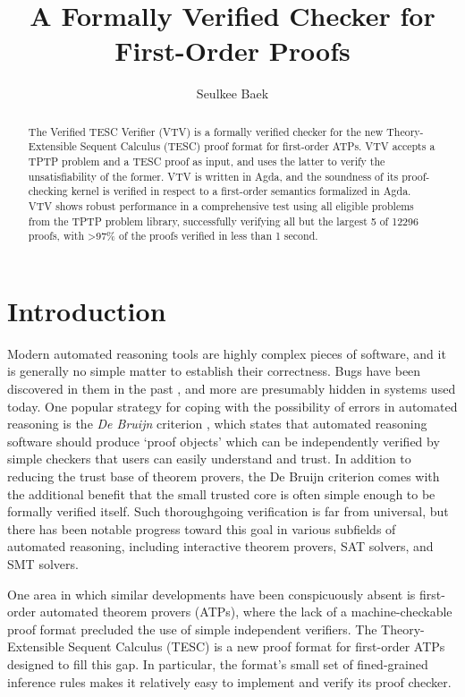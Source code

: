 \documentclass{lipics-v2021}
\title{A Formally Verified Checker for First-Order Proofs}
\author{Seulkee Baek}{Department of Philosophy, Carnegie Mellon University, United States}{seulkeeb@andrew.cmu.edu}{}{}
\begin{document}
\maketitle

\begin{abstract}

The Verified TESC Verifier (VTV) is a formally verified checker for the new 
Theory-Extensible Sequent Calculus (TESC) proof format for first-order ATPs. 
VTV accepts a TPTP problem and a TESC proof as input, and uses the latter to 
verify the unsatisfiability of the former. VTV is written in Agda, and the 
soundness of its proof-checking kernel is verified in respect to a first-order
semantics formalized in Agda. VTV shows robust performance in a comprehensive 
test using all eligible problems from the TPTP problem library, successfully 
verifying all but the largest 5 of 12296 proofs, with >97\% of the 
proofs verified in less than 1 second. 

\end{abstract}

\section{Introduction}

Modern automated reasoning tools are highly complex pieces of software, 
and it is generally no simple matter to establish their correctness.
Bugs have been discovered in them in the past \cite{reger2017testing,harrison2006towards}, 
and more are presumably hidden in systems used today. 
One popular strategy for coping with the possibility of errors 
in automated reasoning is the \textit{De Bruijn} criterion \cite{barendregt2005challenge}, 
which states that automated reasoning software should produce `proof objects' which can be 
independently verified by simple checkers that users can easily understand 
and trust. In addition to reducing the trust base of theorem provers, 
the De Bruijn criterion comes with the additional benefit that the 
small trusted core is often simple enough to be formally verified itself. 
Such thoroughgoing verification is far from universal, but there has been notable 
progress toward this goal in various subfields of automated reasoning, including 
interactive theorem provers, SAT solvers, and SMT solvers.

One area in which similar developments have been conspicuously absent is 
first-order automated theorem provers (ATPs), where the lack of a machine-checkable
proof format \cite{reger2017checkable} precluded the use of simple independent verifiers. 
The Theory-Extensible Sequent Calculus (TESC) is a new 
proof format for first-order ATPs designed to fill this gap. In particular,
the format's small set of fined-grained inference rules makes it relatively 
easy to implement and verify its proof checker.
\end{document}
